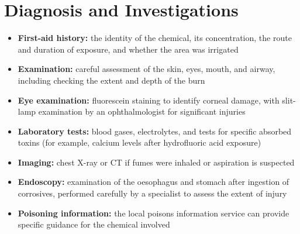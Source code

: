 \section*{Diagnosis and Investigations}
\begin{itemize}
    \item \textbf{First-aid history:} the identity of the chemical, its concentration, the route and duration of exposure, and whether the area was irrigated
    \item \textbf{Examination:} careful assessment of the skin, eyes, mouth, and airway, including checking the extent and depth of the burn
    \item \textbf{Eye examination:} fluorescein staining to identify corneal damage, with slit-lamp examination by an ophthalmologist for significant injuries
    \item \textbf{Laboratory tests:} blood gases, electrolytes, and tests for specific absorbed toxins (for example, calcium levels after hydrofluoric acid exposure)
    \item \textbf{Imaging:} chest X-ray or CT if fumes were inhaled or aspiration is suspected
    \item \textbf{Endoscopy:} examination of the oesophagus and stomach after ingestion of corrosives, performed carefully by a specialist to assess the extent of injury
    \item \textbf{Poisoning information:} the local poisons information service can provide specific guidance for the chemical involved
\end{itemize}

